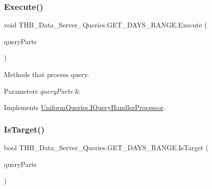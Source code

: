 \subsubsection{\texorpdfstring{Execute()}{Execute()}}
{\footnotesize\ttfamily void T\+H\+B\+\_\+\+Data\+\_\+\+Server\+\_\+\+Queries.\+G\+E\+T\+\_\+\+D\+A\+Y\+S\+\_\+\+R\+A\+N\+G\+E.\+Execute (\begin{DoxyParamCaption}\item[{\mbox{\hyperlink{struct_uniform_queries_1_1_query_part}{Query\+Part}} \mbox{[}$\,$\mbox{]}}]{query\+Parts }\end{DoxyParamCaption})}



Methods that process query. 


\begin{DoxyParams}{Parameters}
{\em query\+Parts} & \\
\hline
\end{DoxyParams}


Implements \mbox{\hyperlink{interface_uniform_queries_1_1_i_query_handler_processor_a2cf42ac286a12dea98c703a86478d36b}{Uniform\+Queries.\+I\+Query\+Handler\+Processor}}.

\mbox{\label{class_t_h_b___data___server___queries_1_1_g_e_t___d_a_y_s___r_a_n_g_e_a1f27cee6dbc3ba3fdfad0590a75d239b}} 
\subsubsection{\texorpdfstring{Is\+Target()}{IsTarget()}}
{\footnotesize\ttfamily bool T\+H\+B\+\_\+\+Data\+\_\+\+Server\+\_\+\+Queries.\+G\+E\+T\+\_\+\+D\+A\+Y\+S\+\_\+\+R\+A\+N\+G\+E.\+Is\+Target (\begin{DoxyParamCaption}\item[{\mbox{\hyperlink{struct_uniform_queries_1_1_query_part}{Query\+Part}} \mbox{[}$\,$\mbox{]}}]{query\+Parts }\end{DoxyParamCaption})}



